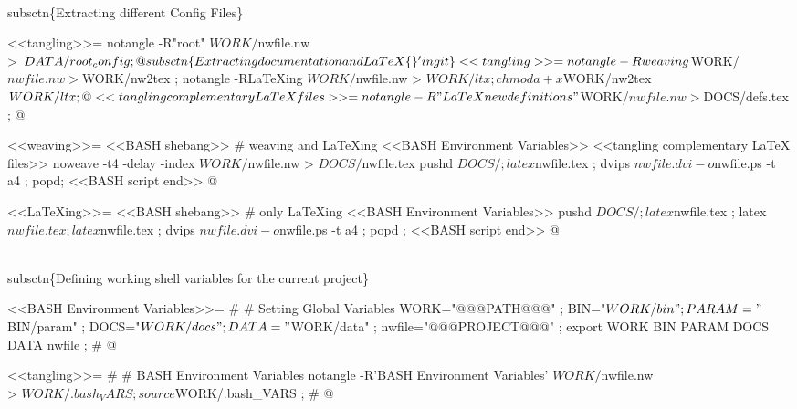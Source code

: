 \documentclass[11pt]{article}
\def\nwendcode{\endtrivlist \endgroup} %
\let\nwdocspar=\par                    %
\begin{document}
\\subsctn\{Extracting different Config Files\} %

<<tangling>>=
notangle -R"root" $WORK/$nwfile.nw \\
    > $DATA/root_config ;
@ %

\\subsctn\{Extracting documentation and \\LaTeX\{\}'ing it\} %

<<tangling>>=
notangle -Rweaving  $WORK/$nwfile.nw > $WORK/nw2tex ;
notangle -RLaTeXing $WORK/$nwfile.nw > $WORK/ltx ;
chmod a+x $WORK/nw2tex $WORK/ltx;
@ 

<<tangling complementary LaTeX files>>=
notangle -R"LaTeX new definitions" $WORK/$nwfile.nw > $DOCS/defs.tex ;
@ 

<<weaving>>=
<<BASH shebang>>
# weaving and LaTeXing
<<BASH Environment Variables>>
<<tangling complementary LaTeX files>>
noweave -t4 -delay -index $WORK/$nwfile.nw > $DOCS/$nwfile.tex 
pushd $DOCS/ ;
latex $nwfile.tex ;
dvips $nwfile.dvi -o $nwfile.ps -t a4 ;
popd;
<<BASH script end>>
@ 

<<LaTeXing>>=
<<BASH shebang>>
# only LaTeXing
<<BASH Environment Variables>>
pushd $DOCS/ ;
latex $nwfile.tex ; 
latex $nwfile.tex ; 
latex $nwfile.tex ;
dvips $nwfile.dvi -o $nwfile.ps -t a4 ;
popd ;
<<BASH script end>>
@ %

\\subsctn\{Defining working shell variables for the current project\} %

<<BASH Environment Variables>>=
#
# Setting Global Variables
WORK="@@@PATH@@@" ;
BIN="$WORK/bin" ;
PARAM="$BIN/param" ;
DOCS="$WORK/docs" ;
DATA="$WORK/data" ;
nwfile="@@@PROJECT@@@" ;
export WORK BIN PARAM DOCS DATA nwfile ;
#
@ 

<<tangling>>=
# 
# BASH Environment Variables
notangle -R'BASH Environment Variables' $WORK/$nwfile.nw \\
         > $WORK/.bash_VARS ; 
source $WORK/.bash_VARS ;
#
@

\nwendcode{}\nwdocspar
\end{document}
